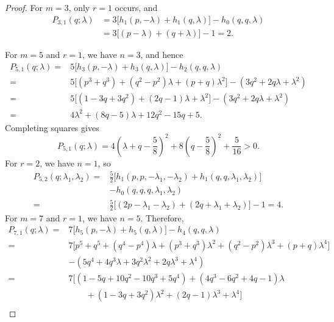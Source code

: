 \documentclass[11pt]{article}
\numberwithin{equation}{section}
\begin{document}
\begin{proof}
  For $m=3$, only $r=1$ occurs, and
  \[
    \begin{aligned}
      P_{3,1}(q;\lambda)
      &=3\bigl[h_1(p,-\lambda)+h_1(q,\lambda)\bigr]
        -h_0(q,q,\lambda)\\
      &=3\bigl[(p-\lambda)+(q+\lambda)\bigr]-1=2.
    \end{aligned}
  \]

  For $m=5$ and $r=1$, we have $n=3$, and hence
  \[
    \begin{aligned}
      P_{5,1}(q;\lambda)
      ={}&5\bigl[h_3(p,-\lambda)+h_3(q,\lambda)\bigr]
          -h_2(q,q,\lambda)\\
      ={}&5\bigl[(p^3+q^3)+(q^2-p^2)\lambda
                  +(p+q)\lambda^2\bigr]
         -(3q^2+2q\lambda+\lambda^2)\\
      ={}&5\bigl[(1-3q+3q^2)+(2q-1)\lambda+\lambda^2\bigr]
         -(3q^2+2q\lambda+\lambda^2)\\
      ={}&4\lambda^2+(8q-5)\lambda+12q^2-15q+5.
    \end{aligned}
  \]
  Completing squares gives
  \[
    P_{5,1}(q;\lambda)
    =4\left(\lambda+q-\frac58\right)^2
     +8\left(q-\frac58\right)^2+\frac5{16}>0.
  \]
  For $r=2$, we have $n=1$, so
  \[
    \begin{aligned}
      P_{5,2}(q;\lambda_1,\lambda_2)
      ={}&\frac52\bigl[
        h_1(p,p,-\lambda_1,-\lambda_2)
        +h_1(q,q,\lambda_1,\lambda_2)\bigr]\\
        &-h_0(q,q,q,\lambda_1,\lambda_2)\\
      ={}&\frac52\bigl[(2p-\lambda_1-\lambda_2)
                       +(2q+\lambda_1+\lambda_2)\bigr]-1=4.
    \end{aligned}
  \]
  For $m=7$ and $r=1$, we have $n=5$.  Therefore,
  \[
    \begin{aligned}
      P_{7,1}(q;\lambda)
      ={}&7\bigl[h_5(p,-\lambda)+h_5(q,\lambda)\bigr]
          -h_4(q,q,\lambda)\\
      ={}&7\bigl[p^5+q^5+(q^4-p^4)\lambda
          +(p^3+q^3)\lambda^2+(q^2-p^2)\lambda^3
          +(p+q)\lambda^4\bigr]\\
         &-(5q^4+4q^3\lambda+3q^2\lambda^2
             +2q\lambda^3+\lambda^4)\\
      ={}&7\bigl[(1-5q+10q^2-10q^3+5q^4)
          +(4q^3-6q^2+4q-1)\lambda\\
         &\qquad +(1-3q+3q^2)\lambda^2
          +(2q-1)\lambda^3+\lambda^4\bigr]\\

\end{aligned}\]
\end{proof}
\end{document}
